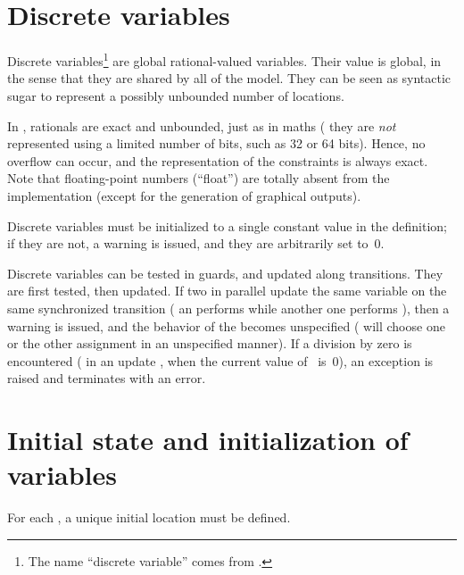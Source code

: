 \section{Discrete variables}\label{section:discrete}

Discrete variables\footnote{%
	The name ``discrete variable'' comes from \hytech{}.
}
are global rational-valued variables.
Their value is global, in the sense that they are shared by all \IPTA{} of the model.
They can be seen as syntactic sugar to represent a possibly unbounded number of locations.

In \imitator{}, rationals are exact and unbounded, just as in maths (\ie{} they are \emph{not} represented using a limited number of bits, such as 32 or 64 bits).
Hence, no overflow can occur, and the representation of the constraints is always exact.
Note that floating-point numbers (``float'') are totally absent from the \imitator{} implementation (except for the generation of graphical outputs).

Discrete variables must be initialized to a single constant value in the  definition;
if they are not, a warning is issued, and they are arbitrarily set to~0.

Discrete variables can be tested in guards, and updated along transitions.
They are first tested, then updated.
If two \IPTA{} in parallel update the same variable on the same synchronized transition (\eg{} an \IPTA{} performs  while another one performs ), then a warning is issued, and the behavior of the \NIPTA{} becomes unspecified (\ie{} \imitator{} will choose one or the other assignment in an unspecified manner).
If a division by zero is encountered (\eg{} in an update , when the current value of~ is~0), an exception is raised and \imitator{} terminates with an error.



\section{Initial state and initialization of variables}\label{section:init}

For each \IPTA{}, a unique initial location must be defined.

